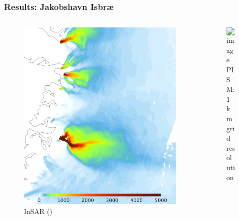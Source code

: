\documentclass[intlimits]{beamer}
\begin{document}
\begin{frame}
  \frametitle{Results: Jakobshavn Isbr{\ae}}
  \vspace{-2em}
  \begin{columns}[t]
    \begin{column}{.48\linewidth}
      \begin{figure}
        \includegraphics[width=\textwidth]{jak-insar-csurf} \\
        \small{InSAR ()}
      \end{figure}
    \end{column}
    \begin{column}{.48\linewidth}
      \begin{figure}
        \includegraphics<1>[width=\textwidth]{jak1km-ssa-csurf} \\
        \small{PISM: 1\,km grid resolution}
      \end{figure}
    \end{column}
  \end{columns}
\end{frame}
\end{document}
